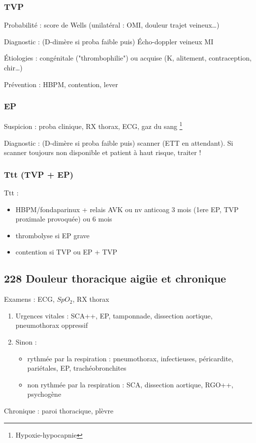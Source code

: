 \documentclass[11pt]{article}
\begin{document}
\subsubsection{TVP}
\label{sec:org3d931eb}
Probabilité : score de Wells (unilatéral : OMI, douleur trajet veineux\ldots{})

Diagnostic : (D-dimère si proba faible puis) Écho-doppler veineux MI

Étiologies : congénitale ("thrombophilie") ou acquise (K, alitement,
contraception, chir\ldots{})

Prévention : HBPM, contention, lever
\subsubsection{EP}
\label{sec:org8b39091}
Suspicion : proba clinique, RX thorax, ECG, gaz du sang \footnote{Hypoxie-hypocapnie}

Diagnostic : (D-dimère si proba faible puis) scanner (ETT en attendant). Si
scanner toujours non disponible et patient à haut risque, traiter !

\subsubsection{Ttt (TVP + EP)}
\label{sec:org27334e7}
Ttt : 
\begin{itemize}
\item HBPM/fondaparinux + relais AVK ou nv anticoag 3 mois (1ere EP, TVP
proximale provoquée) ou 6 mois
\item thrombolyse si EP grave
\item contention si TVP ou EP + TVP
\end{itemize}
\subsection{228 Douleur thoracique aigüe et chronique}
\label{sec:orgc4080b2}
Examens : ECG, \(SpO_2\), RX thorax

\begin{enumerate}
\item Urgences vitales : SCA++, EP, tamponnade, dissection aortique, pneumothorax oppressif
\item Sinon : 
\begin{itemize}
\item rythmée par la respiration : pneumothorax, infectieuses, péricardite,
pariétales, EP, trachéobronchites
\item non rythmée par la respiration : SCA, dissection aortique, RGO++, psychogène
\end{itemize}
\end{enumerate}
Chronique : paroi thoracique, plèvre
\end{document}
